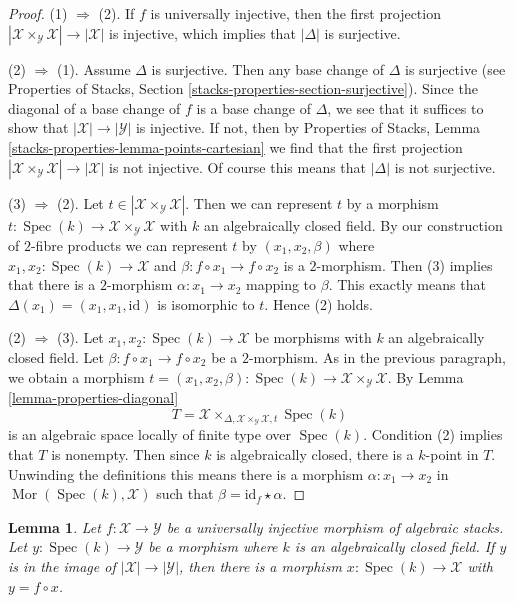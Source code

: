 \documentclass{stacks-project}
\theoremstyle{plain}
\newtheorem{lemma}[subsection]{Lemma}
\theoremstyle{definition}
\theoremstyle{remark}
\numberwithin{equation}{subsection}
\def\Spec{\mathop{\mathrm{Spec}}}
\def\Mor{\mathop{\mathrm{Mor}}\nolimits}
\begin{document}
\begin{proof}
(1) $\Rightarrow$ (2). If $f$ is universally injective, then the
first projection
$|\mathcal{X} \times_\mathcal{Y} \mathcal{X}| \to |\mathcal{X}|$
is injective, which implies that $|\Delta|$ is surjective.

\medskip\noindent
(2) $\Rightarrow$ (1). Assume $\Delta$ is surjective. Then any base change
of $\Delta$ is surjective (see Properties of Stacks, Section
\ref{stacks-properties-section-surjective}).
Since the diagonal of a base change
of $f$ is a base change of $\Delta$, we see that it suffices
to show that $|\mathcal{X}| \to |\mathcal{Y}|$ is injective.
If not, then by Properties of Stacks, Lemma
\ref{stacks-properties-lemma-points-cartesian}
we find that the first projection
$|\mathcal{X} \times_\mathcal{Y} \mathcal{X}| \to |\mathcal{X}|$
is not injective. Of course this means that $|\Delta|$ is not
surjective.

\medskip\noindent
(3) $\Rightarrow$ (2). Let
$t \in |\mathcal{X} \times_\mathcal{Y} \mathcal{X}|$.
Then we can represent $t$ by a morphism
$t : \Spec(k) \to \mathcal{X} \times_\mathcal{Y} \mathcal{X}$
with $k$ an algebraically closed field.
By our construction of $2$-fibre products we can represent
$t$ by $(x_1, x_2, \beta)$ where $x_1, x_2 : \Spec(k) \to \mathcal{X}$
and $\beta : f \circ x_1 \to f \circ x_2$ is a $2$-morphism.
Then (3) implies that there is a $2$-morphism
$\alpha : x_1 \to x_2$ mapping to $\beta$.
This exactly means that $\Delta(x_1) = (x_1, x_1, \text{id})$
is isomorphic to $t$. Hence (2) holds.

\medskip\noindent
(2) $\Rightarrow$ (3). Let $x_1, x_2 : \Spec(k) \to \mathcal{X}$
be morphisms with $k$ an algebraically closed field. Let
$\beta : f \circ x_1 \to f \circ x_2$ be a $2$-morphism.
As in the previous paragraph, we obtain a morphism
$t = (x_1, x_2, \beta) :
\Spec(k) \to \mathcal{X} \times_\mathcal{Y} \mathcal{X}$.
By Lemma \ref{lemma-properties-diagonal}
$$
T = \mathcal{X}
\times_{\Delta, \mathcal{X} \times_\mathcal{Y} \mathcal{X}, t} \Spec(k)
$$
is an algebraic space locally of finite type over $\Spec(k)$.
Condition (2) implies that $T$ is nonempty. Then since $k$ is
algebraically closed, there is a $k$-point in $T$.
Unwinding the definitions this means there is a morphism
$\alpha : x_1 \to x_2$ in $\Mor(\Spec(k), \mathcal{X})$
such that $\beta = \text{id}_f \star \alpha$.
\end{proof}

\begin{lemma}
\label{lemma-universally-injective-point}
Let $f : \mathcal{X} \to \mathcal{Y}$ be a universally injective
morphism of algebraic stacks. Let $y : \Spec(k) \to \mathcal{Y}$
be a morphism where $k$ is an algebraically closed field.
If $y$ is in the image of $|\mathcal{X}| \to |\mathcal{Y}|$,
then there is a morphism $x : \Spec(k) \to \mathcal{X}$
with $y = f \circ x$.
\end{lemma}
\end{document}
